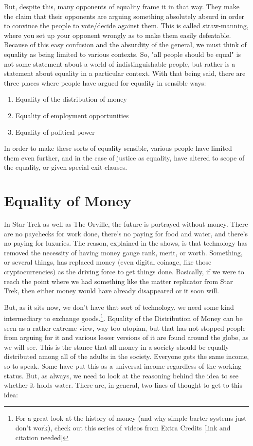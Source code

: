 But, despite this, many opponents of equality frame it in that way. They make the claim that their opponents are arguing something absolutely absurd in order to convince the people to vote/decide against them. This is called straw-manning, where you set up your opponent wrongly as to make them easily defeatable. Because of this easy confusion and the absurdity of the general, we must think of equality as being limited to various contexts. So, "all people should be equal" is not some statement about a world of indistinguishable people, but rather is a statement about equality in a particular context. With that being said, there are three places where people have argued for equality in sensible ways:
\begin{enumerate}
    \item Equality of the distribution of money
    \item Equality of employment opportunities
    \item Equality of political power 
\end{enumerate}
In order to make these sorts of equality sensible, various people have limited them even further, and in the case of justice as equality, have altered to scope of the equality, or given special exit-clauses.

\section{Equality of Money}

In Star Trek as well as The Orville, the future is portrayed without money. There are no paychecks for work done, there's no paying for food and water, and there's no paying for luxuries. The reason, explained in the shows, is that technology has removed the necessity of having money gauge rank, merit, or worth. Something, or several things, has replaced money (even digital coinage, like those cryptocurrencies) as the driving force to get things done. Basically, if we were to reach the point where we had something like the matter replicator from Star Trek, then either money would have already disappeared or it soon will.

But, as it sits now, we don't have that sort of technology, we need some kind intermediary to exchange goods.\footnote{For a great look at the history of money (and why simple barter systems just don't work), check out this series of videos from Extra Credits [link and citation needed]}. Equality of the Distribution of Money can be seen as a rather extreme view, way too utopian, but that has not stopped people from arguing for it and various lesser versions of it are found around the globe, as we will see. This is the stance that all money in a society should be equally distributed among all of the adults in the society. Everyone gets the same income, so to speak. Some have put this as a universal income regardless of the working status. But, as always, we need to look at the reasoning behind the idea to see whether it holds water.  There are, in general, two lines of thought to get to this idea:
